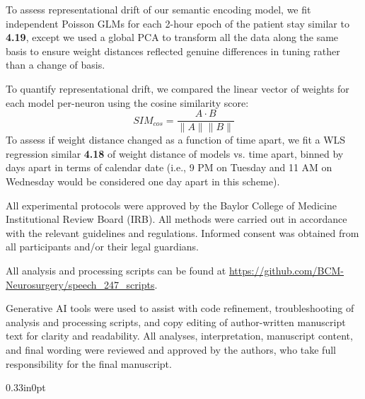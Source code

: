 \documentclass[pdflatex,sn-basic]{sn-jnl}%
\theoremstyle{thmstyleone}%
\theoremstyle{thmstyletwo}%
\theoremstyle{thmstylethree}%
\begin{document}
To assess representational drift of our semantic encoding model, we fit independent Poisson GLMs for each 2-hour epoch of the patient stay similar to \textbf{4.19}, except we used a global PCA to transform all the data along the same basis to ensure weight distances reflected genuine differences in tuning rather than a change of basis.

To quantify representational drift, we compared the linear vector of weights for each model per-neuron using the cosine similarity score:
\[
\mathit{SIM}_\mathit{cos}=\frac{A\cdot B}{\lVert A\rVert \lVert B\rVert}
\]
To assess if weight distance changed as a function of time apart, we fit a WLS regression similar \textbf{4.18} of weight distance of models vs. time apart, binned by days apart in terms of calendar date (i.e., 9 PM on Tuesday and 11 AM on Wednesday would be considered one day apart in this scheme).

\backmatter

All experimental protocols were approved by the Baylor College of Medicine Institutional Review Board (IRB). All methods were carried out in accordance with the relevant guidelines and regulations. Informed consent was obtained from all participants and/or their legal guardians.

All analysis and processing scripts can be found at \url{https://github.com/BCM-Neurosurgery/speech_247_scripts}.

Generative AI tools were used to assist with code refinement, troubleshooting of analysis and processing scripts, and copy editing of author-written manuscript text for clarity and readability. All analyses, interpretation, manuscript content, and final wording were reviewed and approved by the authors, who take full responsibility for the final manuscript.


\clearpage

\begin{adjustwidth}{0.33in}{0pt}
\end{adjustwidth}
\end{document}

